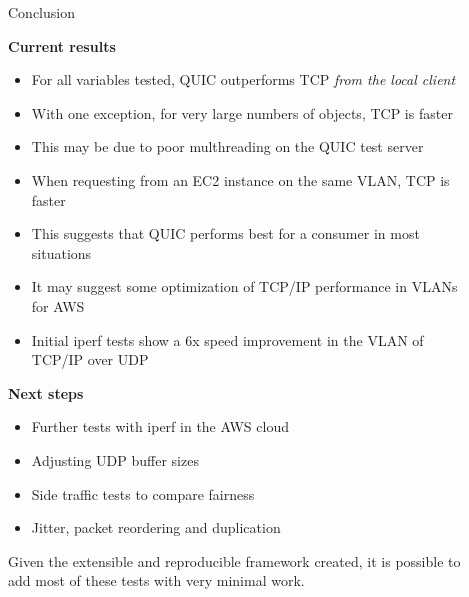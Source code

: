 \documentclass[final]{beamer}
\newlength{\sepwid}
\newlength{\onecolwid}
\begin{document}
\begin{frame}[t]
\begin{columns}[t]
\begin{column}{\onecolwid}
\end{column} %

\begin{column}{\sepwid}\end{column} %

\begin{column}{\onecolwid} %




\begin{block}{Conclusion}

\textbf{Current results}

\begin{itemize}
\item For all variables tested, QUIC outperforms TCP \textit{from the local client}
\item With one exception, for very large numbers of objects, TCP is faster
\item This may be due to poor multhreading on the QUIC test server
\item When requesting from an EC2 instance on the same VLAN, TCP is faster
\item This suggests that QUIC performs best for a consumer in most situations
\item It may suggest some optimization of TCP/IP performance in VLANs for AWS
\item Initial iperf tests show a 6x speed improvement in the VLAN of TCP/IP over UDP
\end{itemize}

\textbf{Next steps}
\begin{itemize}
	\item Further tests with iperf in the AWS cloud
	\item Adjusting UDP buffer sizes
	\item Side traffic tests to compare fairness
	\item Jitter, packet reordering and duplication
\end{itemize}

Given the extensible and reproducible framework created, it is possible to add most of these tests with very minimal work.

\end{block}


\end{column}
\end{columns}
\end{frame}
\end{document}
